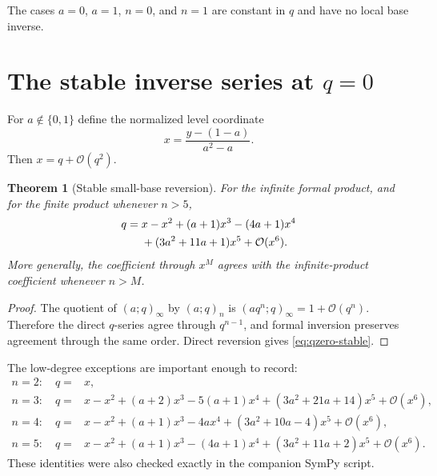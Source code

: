 \documentclass[11pt,oneside]{book}
\newtheorem{theorem}{Theorem}[chapter]
\theoremstyle{definition}
\theoremstyle{remark}
\newcommand{\OO}{\mathcal{O}}
\begin{document}
The cases $a=0$, $a=1$, $n=0$, and $n=1$ are constant in $q$ and have no
local base inverse.

\section{The stable inverse series at $q=0$}
For $a\notin\{0,1\}$ define the normalized level coordinate
\begin{equation}\label{eq:x-normalization-qzero}
 x=\frac{y-(1-a)}{a^2-a}.
\end{equation}
Then $x=q+\OO(q^2)$.

\begin{theorem}[Stable small-base reversion]\label{thm:stable-qzero}
For the infinite formal product, and for the finite product whenever $n>5$,
\begin{align}
 q={}&x-x^2+(a+1)x^3-(4a+1)x^4\notag\\
 &+(3a^2+11a+1)x^5+\OO(x^6).
 \label{eq:qzero-stable}
\end{align}
More generally, the coefficient through $x^M$ agrees with the infinite-product
coefficient whenever $n>M$.
\end{theorem}
\begin{proof}
The quotient of $(a;q)_\infty$ by $(a;q)_n$ is
$(aq^n;q)_\infty=1+\OO(q^n)$.  Therefore the direct $q$-series agree through
$q^{n-1}$, and formal inversion preserves agreement through the same order.
Direct reversion gives \eqref{eq:qzero-stable}.
\end{proof}

The low-degree exceptions are important enough to record:
\begin{align*}
 n=2:\quad q={}&x,\\
 n=3:\quad q={}&x-x^2+(a+2)x^3-5(a+1)x^4
 +(3a^2+21a+14)x^5+\OO(x^6),\\
 n=4:\quad q={}&x-x^2+(a+1)x^3-4ax^4
 +(3a^2+10a-4)x^5+\OO(x^6),\\
 n=5:\quad q={}&x-x^2+(a+1)x^3-(4a+1)x^4
 +(3a^2+11a+2)x^5+\OO(x^6).
\end{align*}
These identities were also checked exactly in the companion SymPy script.
\end{document}
